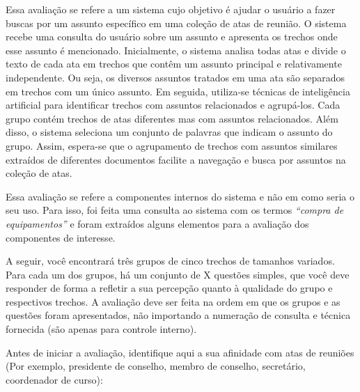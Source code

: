 
Essa avaliação se refere a um sistema cujo objetivo é ajudar o usuário a fazer buscas por um assunto específico em uma coleção de atas de reunião. O sistema recebe uma consulta do usuário sobre um assunto e apresenta os trechos onde esse assunto é mencionado. Inicialmente, o sistema analisa todas atas e divide o texto de cada ata em trechos que contêm um assunto principal e relativamente independente. Ou seja, os diversos assuntos tratados em uma ata são separados em trechos com um único assunto. Em seguida, utiliza-se técnicas de inteligência artificial para identificar trechos com assuntos relacionados e agrupá-los. Cada grupo contém trechos de atas diferentes mas com assuntos relacionados. Além disso, o sistema seleciona um conjunto de palavras que indicam o assunto do grupo. Assim, espera-se que o agrupamento de trechos com assuntos similares extraídos de diferentes documentos facilite a navegação e busca por assuntos na coleção de atas.

Essa avaliação se refere a componentes internos do sistema e não em como seria o seu uso. Para isso, foi feita uma consulta ao sistema com os termos \textit{``compra de equipamentos''} e foram extraídos 
%
%
alguns elementos 
para a avaliação dos componentes de interesse.

A seguir, você encontrará três grupos de cinco trechos de tamanhos variados. Para cada um dos grupos, há um conjunto de X questões simples, que você deve responder de forma a refletir a sua percepção quanto à qualidade do grupo e respectivos trechos. A avaliação deve ser feita na ordem em que os grupos e as questões foram apresentados, não importando a numeração de consulta e técnica fornecida (são apenas para controle interno).

Antes de iniciar a avaliação, identifique aqui a sua afinidade com atas de reuniões (Por exemplo, presidente de conselho, membro de conselho, secretário, coordenador de curso):









